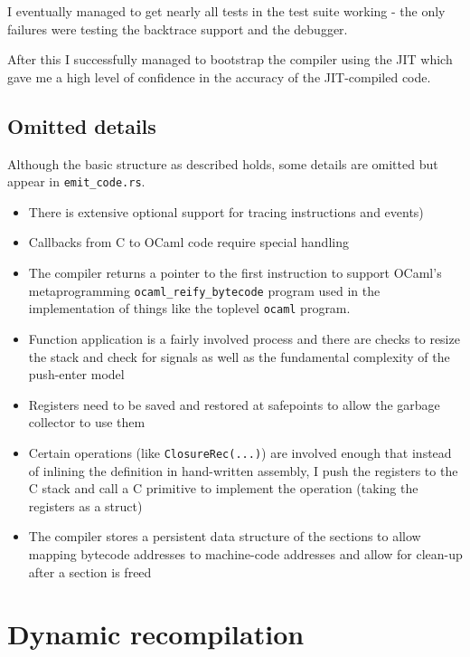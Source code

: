 I eventually managed to get nearly all tests in the test suite working - the only failures were
testing the backtrace support and the debugger.

After this I successfully managed to bootstrap the compiler using the JIT which gave me a high
level
of confidence in the accuracy of the JIT-compiled code.

\subsection{Omitted details}

Although the basic structure as described holds, some details are omitted but appear in
\texttt{emit\_code.rs}.

\begin{itemize}
      \item There is extensive optional support for tracing instructions and events)
      \item Callbacks from C to OCaml code require special handling
      \item The compiler returns a pointer to the first instruction to support OCaml's
            metaprogramming \texttt{ocaml\_reify\_bytecode} program used in the implementation of
            things like the
            toplevel \texttt{ocaml} program.
      \item Function application is a fairly involved process and there are checks to resize the
            stack and check for signals as well as the fundamental complexity of the push-enter
            model
      \item Registers need to be saved and restored at safepoints to allow the garbage collector to
            use them
      \item Certain operations (like \texttt{ClosureRec(...)}) are involved enough that instead of
            inlining the definition in
            hand-written assembly, I push the registers to the C stack and call a C primitive to
            implement the
            operation (taking the registers as a struct)
      \item The compiler stores a persistent data structure of the sections to allow mapping
            bytecode addresses to machine-code addresses and allow for clean-up after a section is
            freed
\end{itemize}

\section{Dynamic recompilation} \label{dyn-recomp}

